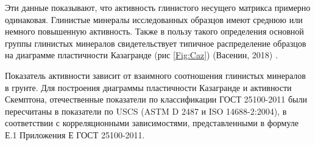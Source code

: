 Эти данные показывают, что активность глинистого несущего матрикса примерно одинаковая. Глинистые минералы исследованных образцов имеют среднюю или немного повышенную активность.
Также в пользу такого определения основной группы глинистых минералов свидетельствует типичное распределение образцов на диаграмме пластичности Казагранде (рис \ref{Fig:Caz}) (Васенин, 2018) \cite{vasenin2018}.

Показатель активности зависит от взаимного соотношения глинистых минералов в грунте.
Для построения диаграммы пластичности Казагранде и активности Скемптона, отечественные показатели по классификации ГОСТ 25100-2011 были пересчитаны в показатели по USCS (ASTM D 2487 и ISO 14688-2:2004), 
в соответствии с корреляционными зависимостями, представленными в формуле Е.1 Приложения Е ГОСТ 25100-2011.








